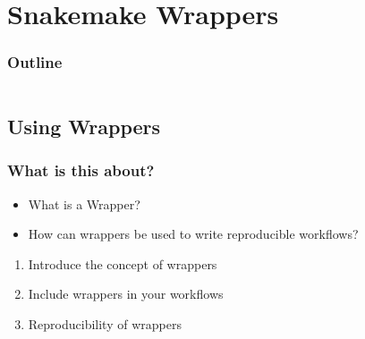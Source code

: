 \section{Snakemake Wrappers}

\begin{frame}
    \frametitle{Outline}
    \begin{columns}[t]
        \begin{column}{.5\textwidth}
            \tableofcontents[sections={1-7},currentsection]
        \end{column}
        \begin{column}{.5\textwidth}
            \tableofcontents[sections={8-15},currentsection]
        \end{column}
    \end{columns}
\end{frame}

\subsection{Using Wrappers}

\begin{frame}
    \frametitle{What is this about?}
    \begin{question}[Questions]
        \begin{itemize}
            \item What is a \Snakemake{} Wrapper?
            \item How can \Snakemake{} wrappers be used to write reproducible workflows?
        \end{itemize}
    \end{question}
    \begin{docs}[Objectives]
        \begin{enumerate}
            \item Introduce the concept of \Snakemake{} wrappers
            \item Include \Snakemake{} wrappers in your workflows
            \item Reproducibility of \Snakemake{} wrappers
        \end{enumerate}
    \end{docs}
\end{frame}

